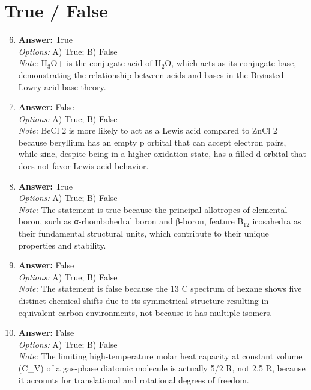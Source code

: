 \documentclass[12pt]{article}
\begin{document}
\section*{True / False}
\begin{enumerate}[label=\arabic*.]
\setcounter{enumi}{5}
\item \textbf{Answer:} True
\\ \textit{Options:} A) True; B) False
\\ \textit{Note:} H$_{3}$O+ is the conjugate acid of H$_{2}$O, which acts as its conjugate base, demonstrating the relationship between acids and bases in the Brønsted-Lowry acid-base theory.
\item \textbf{Answer:} False
\\ \textit{Options:} A) True; B) False
\\ \textit{Note:} BeCl 2 is more likely to act as a Lewis acid compared to ZnCl 2 because beryllium has an empty p orbital that can accept electron pairs, while zinc, despite being in a higher oxidation state, has a filled d orbital that does not favor Lewis acid behavior.
\item \textbf{Answer:} True
\\ \textit{Options:} A) True; B) False
\\ \textit{Note:} The statement is true because the principal allotropes of elemental boron, such as α-rhombohedral boron and β-boron, feature B$_{12}$ icosahedra as their fundamental structural units, which contribute to their unique properties and stability.
\item \textbf{Answer:} False
\\ \textit{Options:} A) True; B) False
\\ \textit{Note:} The statement is false because the 13 C spectrum of hexane shows five distinct chemical shifts due to its symmetrical structure resulting in equivalent carbon environments, not because it has multiple isomers.
\item \textbf{Answer:} False
\\ \textit{Options:} A) True; B) False
\\ \textit{Note:} The limiting high-temperature molar heat capacity at constant volume (C\_V) of a gas-phase diatomic molecule is actually 5/2 R, not 2.5 R, because it accounts for translational and rotational degrees of freedom.
\end{enumerate}
\end{document}
